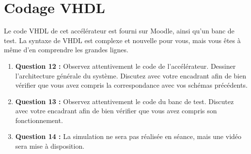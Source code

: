 \documentclass[a4paper,11pt]{article}
\newif\ifsolutions
\begin{document}
\ifsolutions
\begin{solbox}
\textbf{Question 9 :} Par exemple, avec $n=8$ et $n'=8$, $s_n, s_{n'} \in \{0 \dots 255\}$ et $s_n+s_{n'} \in \{0 \dots 510\}$. On se convainc facilement que le nombre de bits pour le résultat de l'addition est $\mathbf{max(n,n')+1}$.

\vspace{0.5em}
\textbf{Question 10 :} Pour la multiplication le résultat est $\mathbf{n+n'}$.

\vspace{0.5em}
\textbf{Question 11 :} À la fin de chaque CSTEP, la dynamique des signaux calculés augmente. Si chaque entrée est codée sur un même nombre $n$ de bits :
\begin{itemize}
    \item CSTEP 1 : R3 nécessite $2n+1$ bits
    \item CSTEP 2 : R3 nécessite $(2n+1)+n+1=3n+2$ bits
    \item CSTEP 3 : R3 nécessite $(3n+2)+n+1=4n+3$ bits
\end{itemize}
À titre d'exemple, partant de $n=8$ bits, on obtient \textbf{35 bits} nécessaires en sortie.
\end{solbox}
\fi


\section{Codage VHDL}

Le code VHDL de cet accélérateur est fourni sur Moodle, ainsi qu'un banc de test. La syntaxe de VHDL est complexe et nouvelle pour vous, mais vous êtes à même d'en comprendre les grandes lignes.

\begin{questionbox}
\begin{enumerate}
    \item \textbf{Question 12 :} Observez attentivement le code de l'accélérateur. Dessiner l'architecture générale du système. Discutez avec votre encadrant afin de bien vérifier que vous avez compris la correspondance avec vos schémas précédents.
    \item \textbf{Question 13 :} Observez attentivement le code du banc de test. Discutez avec votre encadrant afin de bien vérifier que vous avez compris son fonctionnement.
    \item \textbf{Question 14 :} La simulation ne sera pas réalisée en séance, mais une vidéo sera mise à disposition.
\end{enumerate}
\end{questionbox}
\end{document}
